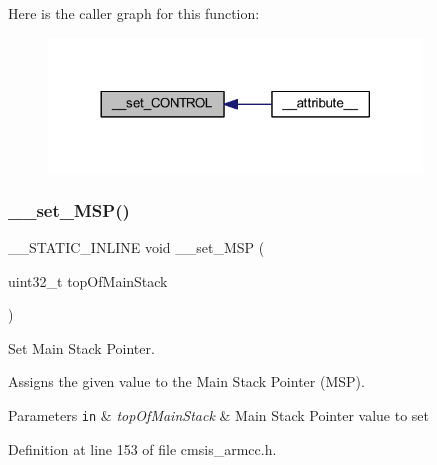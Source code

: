 Here is the caller graph for this function\+:
\nopagebreak
\begin{figure}[H]
\begin{center}
\leavevmode
\includegraphics[width=281pt]{group___c_m_s_i_s___core___reg_acc_functions_ga558df7eeb0a34765e0b54d9853d08484_icgraph}
\end{center}
\end{figure}
\mbox{\label{group___c_m_s_i_s___core___reg_acc_functions_ga1ff33c0b5ed0e687dd7967a1dd283d5f}} 
\subsubsection{\texorpdfstring{\+\_\+\+\_\+set\+\_\+\+M\+S\+P()}{\_\_set\_MSP()}}
{\footnotesize\ttfamily \+\_\+\+\_\+\+S\+T\+A\+T\+I\+C\+\_\+\+I\+N\+L\+I\+NE void \+\_\+\+\_\+set\+\_\+\+M\+SP (\begin{DoxyParamCaption}\item[{uint32\+\_\+t}]{top\+Of\+Main\+Stack }\end{DoxyParamCaption})}



Set Main Stack Pointer. 

Assigns the given value to the Main Stack Pointer (M\+SP). 
\begin{DoxyParams}[1]{Parameters}
\mbox{\tt in}  & {\em top\+Of\+Main\+Stack} & Main Stack Pointer value to set \\
\hline
\end{DoxyParams}


Definition at line 153 of file cmsis\+\_\+armcc.\+h.

